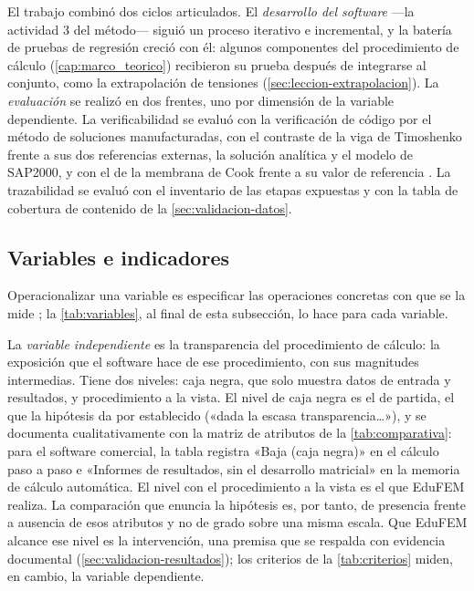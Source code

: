 El trabajo combinó dos ciclos articulados. El \emph{desarrollo del software} ---la actividad 3 del método--- siguió un proceso iterativo e incremental, y la batería de pruebas de regresión creció con él: algunos componentes del procedimiento de cálculo (\autoref{cap:marco_teorico}) recibieron su prueba después de integrarse al conjunto, como la extrapolación de tensiones (\autoref{sec:leccion-extrapolacion}). La \emph{evaluación} se realizó en dos frentes, uno por dimensión de la variable dependiente. La verificabilidad se evaluó con la verificación de código por el método de soluciones manufacturadas, con el contraste de la viga de Timoshenko frente a sus dos referencias externas, la solución analítica y el modelo de SAP2000, y con el de la membrana de Cook frente a su valor de referencia \autocite{oberkampf2010vv,salari2000mms}. La trazabilidad se evaluó con el inventario de las etapas expuestas y con la tabla de cobertura de contenido de la \autoref{sec:validacion-datos}.

\subsection{Variables e indicadores}
\label{sec:variables-met}

Operacionalizar una variable es especificar las operaciones concretas con que se la mide \autocite[p.~137]{sampieri2018metodologia}; la \autoref{tab:variables}, al final de esta subsección, lo hace para cada variable.

La \emph{variable independiente} es la transparencia del procedimiento de cálculo: la exposición que el software hace de ese procedimiento, con sus magnitudes intermedias. Tiene dos niveles: caja negra, que solo muestra datos de entrada y resultados, y procedimiento a la vista. El nivel de caja negra es el de partida, el que la hipótesis da por establecido («dada la escasa transparencia…»), y se documenta cualitativamente con la matriz de atributos de la \autoref{tab:comparativa}: para el software comercial, la tabla registra «Baja (caja negra)» en el cálculo paso a paso e «Informes de resultados, sin el desarrollo matricial» en la memoria de cálculo automática. El nivel con el procedimiento a la vista es el que EduFEM realiza. La comparación que enuncia la hipótesis es, por tanto, de presencia frente a ausencia de esos atributos y no de grado sobre una misma escala. Que EduFEM alcance ese nivel es la intervención, una premisa que se respalda con evidencia documental (\autoref{sec:validacion-resultados}); los criterios de la \autoref{tab:criterios} miden, en cambio, la variable dependiente.

